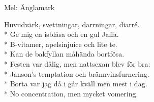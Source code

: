 \begin{SongText}[Bakfyllesång]
    \begin{SongInfo}
        Mel: Änglamark
    \end{SongInfo}
    \begin{SongVerse}
        Huvudvärk, svettningar, darrningar, diarré.\\*%
        Ge mig en isblåsa och en gul Jaffa.\\*%
        B-vitamer, apelsinjuice och lite te.\\*%
        Kan de bakfyllan måhända bortfösa.\\*%
        Festen var dålig, men nattsexan blev för bra:\\*%
        Janson's temptation och brännvinsfurnering.\\*%
        Borta var jag då i går kväll men mest i dag.\\*%
        No concentration, men mycket vomering.
    \end{SongVerse}
\end{SongText}
